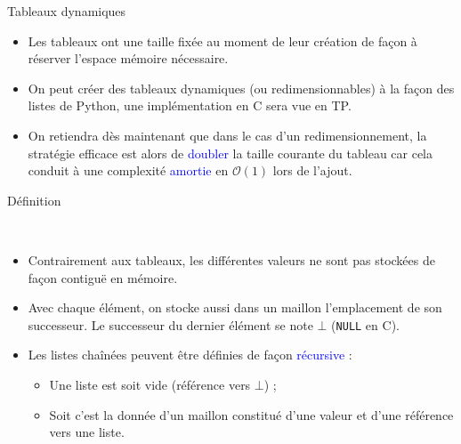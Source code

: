 \documentclass[10pt]{beamer}
\begin{document}
\begin{frame}{\Ctitle}{\stitle}
	\begin{block}{Tableaux dynamiques}
		\begin{itemize}
			\item<1-> Les tableaux ont une taille fixée au moment de leur création de façon à réserver l'espace mémoire nécessaire.
			\item<2-> On peut créer des tableaux dynamiques (ou redimensionnables) à la façon des listes de Python, une implémentation en C sera vue en TP.
			\item<3-> On retiendra dès maintenant que dans le cas d'un redimensionnement, la stratégie efficace est alors de \textcolor{blue}{doubler} la taille courante du tableau car cela conduit à une complexité \textcolor{blue}{amortie} en $\mathcal{O}(1)$ lors de l'ajout.
		\end{itemize}
	\end{block}
\end{frame}


\begin{frame}{\Ctitle}{\stitle}
	\begin{alertblock}{Définition}
		\begin{center}
			  \quad {} \          \  
		\end{center}
		\begin{itemize}
			\item<2-> Contrairement aux tableaux, les différentes valeurs ne sont pas stockées de façon contiguë en mémoire.
			\item<3-> Avec chaque élément, on stocke aussi dans un \og{} maillon \fg{} l'emplacement de son successeur. Le successeur du dernier élément se note $\bot$ (\texttt{NULL} en C).
			\item<4-> Les listes chaînées peuvent être définies de façon \textcolor{blue}{récursive} :
				\begin{itemize}
					\item<5-> Une liste est soit vide (référence vers $\bot$) ;
					\item<6-> Soit c'est la donnée d'un maillon constitué d'une valeur et d'une référence vers une liste.
				\end{itemize}
		\end{itemize}
	\end{alertblock}
\end{frame}
\end{document}
